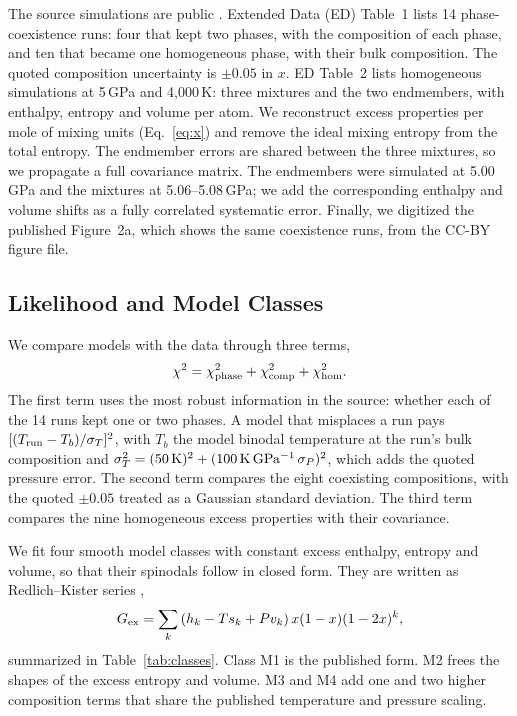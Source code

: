 The source simulations are public \cite{gilmore2026data}. Extended Data (ED) Table~1 lists
14 phase-coexistence runs: four that kept two phases, with the composition of each phase, and
ten that became one homogeneous phase, with their bulk composition. The quoted composition
uncertainty is $\pm0.05$ in $x$. ED Table~2 lists homogeneous simulations at 5\,GPa and
4,000\,K: three mixtures and the two endmembers, with enthalpy, entropy and volume per atom.
We reconstruct excess properties per mole of mixing units (Eq.~\ref{eq:x}) and remove the
ideal mixing entropy from the total entropy. The endmember errors are shared between the
three mixtures, so we propagate a full covariance matrix. The endmembers were simulated at
5.00\,GPa and the mixtures at 5.06--5.08\,GPa; we add the corresponding enthalpy and volume
shifts as a fully correlated systematic error. Finally, we digitized the published
Figure~2a, which shows the same coexistence runs, from the CC-BY figure file.

\subsection{Likelihood and Model Classes}

We compare models with the data through three terms,
\begin{equation}
\chi^2 = \chi^2_{\rm phase} + \chi^2_{\rm comp} + \chi^2_{\rm hom}.
\label{eq:chi2}
\end{equation}
The first term uses the most robust information in the source: whether each of the 14 runs
kept one or two phases. A model that misplaces a run pays
$[(T_{\rm run}-T_b)/\sigma_T]^2$, with $T_b$ the model binodal temperature at the run's bulk
composition and $\sigma_T^2 = (50\,{\rm K})^2 + (100\,{\rm K\,GPa^{-1}}\,\sigma_P)^2$, which
adds the quoted pressure error. The second term compares the eight coexisting compositions,
with the quoted $\pm0.05$ treated as a Gaussian standard deviation. The third term compares
the nine homogeneous excess properties with their covariance.

We fit four smooth model classes with constant excess enthalpy, entropy and volume, so that
their spinodals follow in closed form. They are written as Redlich--Kister series
\cite{redlich1948},
\begin{equation}
G_{\rm ex} = \sum_k \left(h_k - T s_k + P v_k\right) x(1-x)(1-2x)^k,
\label{eq:rk}
\end{equation}
summarized in Table~\ref{tab:classes}. Class M1 is the published form. M2 frees the shapes
of the excess entropy and volume. M3 and M4 add one and two higher composition terms that
share the published temperature and pressure scaling.

